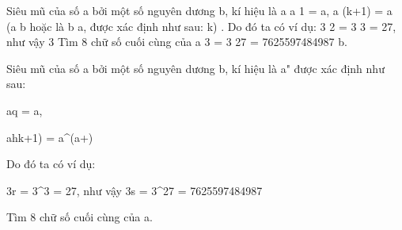 Siêu mũ của số a bởi một số nguyên dương b, kí hiệu là a       a 1 = a,       a (k+1) = a (a       b hoặc là b a, được xác định như sau:       k)       .       Do đó ta có ví dụ: 3       2 = 3 3 = 27, như vậy 3       Tìm 8 chữ số cuối cùng của a       3 = 3 27 = 7625597484987       b.    

   Siêu mũ của số a bởi một số nguyên dương b, kí hiệu là a^^b được xác định như sau:  

   a^^1 = a,  

   a^^(k+1) = a^(a^^k)  

   Do đó ta có ví dụ:  

   3^^2 = 3^3 = 27, như vậy 3^^3 = 3^27 = 7625597484987  

   Tìm 8 chữ số cuối cùng của a.